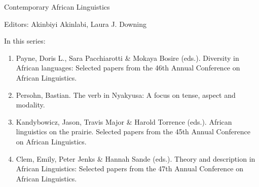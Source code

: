 {\large Contemporary African Linguistics}

\bigskip

Editors: Akinbiyi Akinlabi,  Laura J. Downing  


\bigskip

In this series:

\begin{enumerate}
\item Payne, Doris L., Sara Pacchiarotti \& Mokaya Bosire (eds.). Diversity in African languages: Selected papers from the 46th Annual Conference on African Linguistics.
\item Persohn, Bastian. The verb in Nyakyusa: A focus on tense, aspect and modality.
\item Kandybowicz, Jason, Travis Major \& Harold Torrence (eds.). African linguistics on the prairie. Selected papers from the 45th Annual Conference on African Linguistics.
\item Clem, Emily,    Peter Jenks   \& Hannah Sande (eds.).   Theory and description in African Linguistics: Selected papers from the 47th Annual Conference on African Linguistics.
 
\end{enumerate}


\vfill

